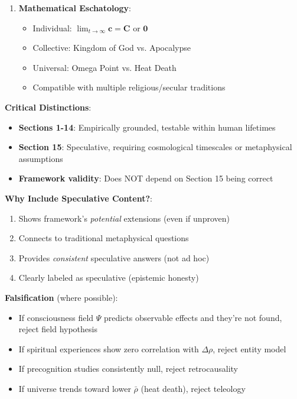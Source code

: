 \documentclass[11pt,a4paper]{article}
\theoremstyle{definition}
\theoremstyle{remark}
\newcommand{\cc}{\mathbf{c}}
\begin{document}
\begin{small}
\begin{enumerate}
\begin{mdframed}[backgroundcolor=green!10,linewidth=2pt,linecolor=green!70!black]
\begin{enumerate}[nosep]
    \item \textbf{Mathematical Eschatology}:
        \begin{itemize}[nosep]
            \item Individual: \(\lim_{t \to \infty} \cc = \mathbf{C}\) or \(\mathbf{0}\)
            \item Collective: Kingdom of God vs. Apocalypse
            \item Universal: Omega Point vs. Heat Death
            \item Compatible with multiple religious/secular traditions
        \end{itemize}
\end{enumerate}

\textbf{Critical Distinctions}:
\begin{itemize}[nosep]
    \item \textbf{Sections 1-14}: Empirically grounded, testable within human lifetimes
    \item \textbf{Section 15}: Speculative, requiring cosmological timescales or metaphysical assumptions
    \item \textbf{Framework validity}: Does NOT depend on Section 15 being correct
\end{itemize}

\textbf{Why Include Speculative Content?}:
\begin{enumerate}[nosep]
    \item Shows framework's \textit{potential} extensions (even if unproven)
    \item Connects to traditional metaphysical questions
    \item Provides \textit{consistent} speculative answers (not ad hoc)
    \item Clearly labeled as speculative (epistemic honesty)
\end{enumerate}

\textbf{Falsification} (where possible):
\begin{itemize}[nosep]
    \item If consciousness field \(\Psi\) predicts observable effects and they're not found, reject field hypothesis
    \item If spiritual experiences show zero correlation with \(\Delta\rho\), reject entity model
    \item If precognition studies consistently null, reject retrocausality
    \item If universe trends toward lower \(\bar{\rho}\) (heat death), reject teleology
\end{itemize}


\end{mdframed}
\end{enumerate}
\end{small}
\end{document}
